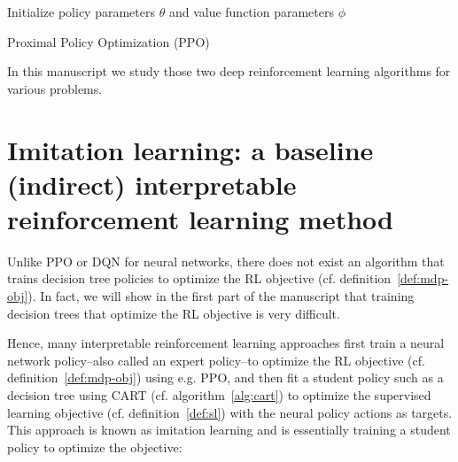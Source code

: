\begin{algorithm}
    Initialize policy parameters $\theta$ and value function parameters $\phi$ \\
    \caption{Proximal Policy Optimization (PPO)~\cite{ppo}}\label{alg:ppo}
\end{algorithm}
In this manuscript we study those two deep reinforcement learning algorithms for various problems.

\section{Imitation learning: a baseline (indirect) interpretable reinforcement learning method}\label{sec:imit}

Unlike PPO or DQN for neural networks, there does not exist an algorithm that trains decision tree policies to optimize the RL objective (cf. definition~\ref{def:mdp-obj}).
In fact, we will show in the first part of the manuscript that training decision trees that optimize the RL objective is very difficult.

Hence, many interpretable reinforcement learning approaches first train a neural network policy--also called an expert policy--to optimize the RL objective (cf. definition~\ref{def:mdp-obj}) using e.g. PPO, and then fit a student policy such as a decision tree using CART (cf. algorithm~\ref{alg:cart}) to optimize the supervised learning objective (cf. definition~\ref{def:sl}) with the neural policy actions as targets.
This approach is known as imitation learning and is essentially training a student policy to optimize the objective:

